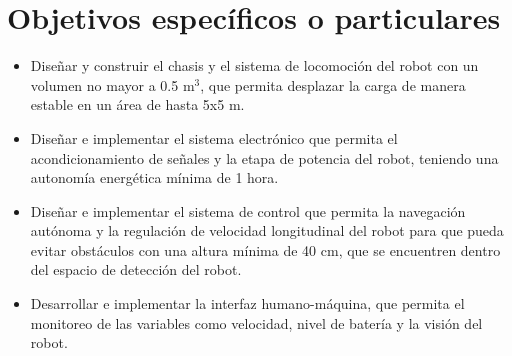 \section{Objetivos específicos o particulares}
\label{sec:proto-objetivos-especificos}


\vspace{-0.2cm}
\begin{itemize}
    \item Diseñar y construir el chasis y el sistema de locomoción del robot con un volumen no mayor a 0.5 m$^3$, que permita desplazar la carga de manera estable en un área de hasta 5x5 m.
    \item Diseñar e implementar el sistema electrónico que permita el acondicionamiento de señales y la etapa de potencia del robot, teniendo una autonomía energética mínima de 1 hora.
    \item Diseñar e implementar el sistema de control que permita la navegación autónoma y la regulación de velocidad longitudinal del robot para que pueda evitar obstáculos con una altura mínima de 40 cm, que se encuentren dentro del espacio de detección del robot.
    \item Desarrollar e implementar la interfaz humano-máquina, que permita el monitoreo de las variables como velocidad, nivel de batería y la visión del robot.
\end{itemize}

